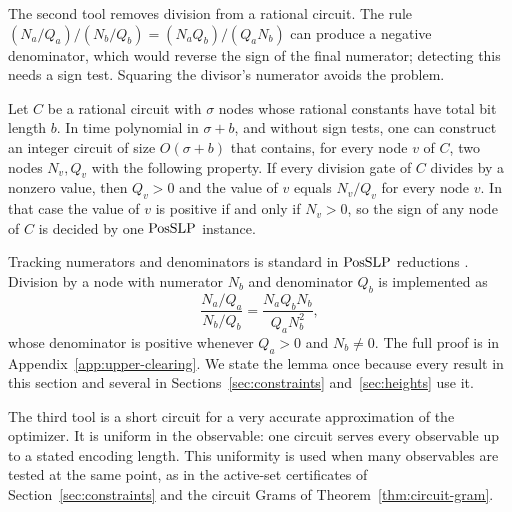 The second tool removes division from a rational circuit. The rule
$(N_a/Q_a)/(N_b/Q_b)=(N_aQ_b)/(Q_aN_b)$ can produce a negative denominator,
which would reverse the sign of the final numerator; detecting this needs a
sign test. Squaring the divisor's numerator avoids the problem.

\begin{lemma}
\label{lem:denominator-clearing}
Let $C$ be a rational circuit with $\sigma$ nodes whose rational constants
have total bit length $b$. In time polynomial in $\sigma+b$, and without
sign tests, one can construct an integer circuit of size $O(\sigma+b)$ that
contains, for every node $v$ of $C$, two nodes $N_v,Q_v$ with the following
property. If every division gate of $C$ divides by a nonzero value, then
$Q_v>0$ and the value of $v$ equals $N_v/Q_v$ for every node $v$. In that
case the value of $v$ is positive if and only if $N_v>0$, so the sign of any
node of $C$ is decided by one $\mathrm{PosSLP}$ instance.
\end{lemma}

Tracking numerators and denominators is standard in $\mathrm{PosSLP}$ reductions
\citep{AllenderEtAl2009,EtessamiStewartYannakakis2012}. Division by a node
with numerator $N_b$ and denominator $Q_b$ is implemented as
\begin{equation}
 \frac{N_a/Q_a}{N_b/Q_b}=\frac{N_aQ_bN_b}{Q_aN_b^2},
 \label{eq:upper-division}
\end{equation}
whose denominator is positive whenever $Q_a>0$ and $N_b\ne0$. The full
proof is in Appendix~\ref{app:upper-clearing}. We state the lemma once
because every result in this section and several in
Sections~\ref{sec:constraints} and~\ref{sec:heights} use it.

The third tool is a short circuit for a very accurate approximation of the
optimizer. It is uniform in the observable: one circuit serves every
observable up to a stated encoding length. This uniformity is used when many
observables are tested at the same point, as in the active-set certificates
of Section~\ref{sec:constraints} and the circuit Grams of
Theorem~\ref{thm:circuit-gram}.

